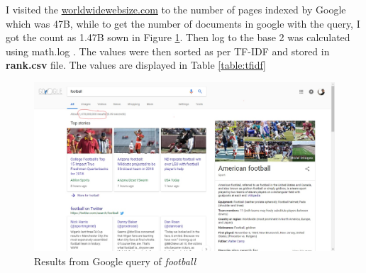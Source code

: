 \documentclass[letterpaper,11pt]{article}
\begin{document}


I visited the \url{worldwidewebsize.com} to the number of pages indexed by Google which was 47B, while to get the number of documents in google with the query, I got the count as 1.47B sown in Figure \ref{fig:q2cali}. Then log to the base 2 was calculated using math.log \cite{mathref}. The values were then sorted as per TF-IDF and stored in \textbf{rank.csv} file. The values are displayed in Table \ref{table:tfidf}


\begin{figure}[h]
\centering
\includegraphics[scale=0.33]{idfDocsTerm.jpg}
\caption{Results from Google query of \emph{football}}
\label{fig:q2cali}
\end{figure}
\end{document}
